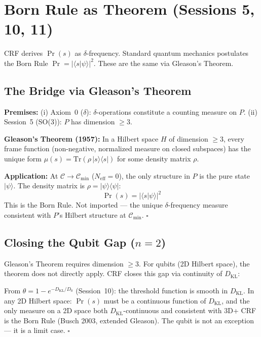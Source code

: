 \documentclass[12pt, a4paper]{article}
\begin{document}
\section{Born Rule as Theorem (Sessions 5, 10, 11)}

CRF derives $\Pr(s)$ as $\delta$-frequency. Standard quantum mechanics postulates the
Born Rule $\Pr = |\langle s|\psi\rangle|^2$. These are the same via Gleason's Theorem.

\subsection{The Bridge via Gleason's Theorem}

\begin{derivedbox}[title={Theorem: Born Rule from $\delta$-Statistics}]
\textbf{Premises:}
(i) Axiom~0 ($\delta$): $\delta$-operations constitute a counting measure on $P$.
(ii) Session~5 (SO(3)): $P$ has dimension $\geq 3$.

\textbf{Gleason's Theorem (1957):} In a Hilbert space $H$ of dimension $\geq 3$,
every frame function (non-negative, normalized measure on closed subspaces) has the
unique form $\mu(s) = \mathrm{Tr}(\rho\,|s\rangle\langle s|)$ for some density
matrix $\rho$.

\textbf{Application:} At $\mathcal{C} \to \mathcal{C}_{\min}$ ($N_{\mathrm{eff}} = 0$),
the only structure in $P$ is the pure state $|\psi\rangle$. The density matrix is
$\rho = |\psi\rangle\langle\psi|$:
\[
  \Pr(s) = |\langle s|\psi\rangle|^2
\]
This is the Born Rule. Not imported --- the unique $\delta$-frequency measure consistent
with $P$'s Hilbert structure at $\mathcal{C}_{\min}$. $\square$
\end{derivedbox}

\subsection{Closing the Qubit Gap ($n = 2$)}

Gleason's Theorem requires dimension $\geq 3$. For qubits (2D Hilbert space), the theorem
does not directly apply. CRF closes this gap via continuity of $D_{\mathrm{KL}}$:

\begin{derivedbox}[title={Qubit Closure via $D_{\mathrm{KL}}$ Continuity}]
From $\theta = 1 - e^{-D_{\mathrm{KL}}/D_0}$ (Session~10): the threshold function is
smooth in $D_{\mathrm{KL}}$. In any 2D Hilbert space: $\Pr(s)$ must be a continuous
function of $D_{\mathrm{KL}}$, and the only measure on a 2D space both
$D_{\mathrm{KL}}$-continuous and consistent with 3D+ CRF is the Born Rule (Busch 2003,
extended Gleason). The qubit is not an exception --- it is a limit case. $\square$
\end{derivedbox}
\end{document}
